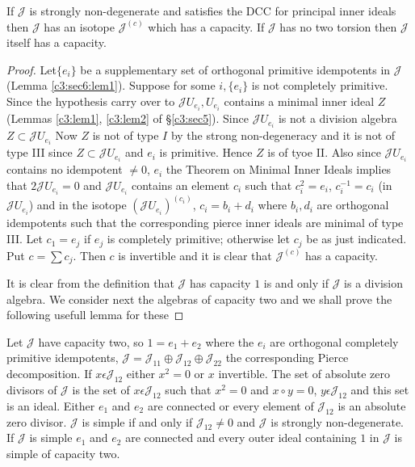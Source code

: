 \begin{thm}\label{c3:thm7}
If $\mathscr{J}$ is strongly non-degenerate and satisfies the DCC for
principal inner ideals then $\mathscr{J}$ has an isotope
$\mathscr{J}^{(c)}$ which has a capacity. If $\mathscr{J}$ has no two
torsion then $\mathscr{J}$ itself has a capacity.
\end{thm}

\begin{proof}
Let\pageoriginale $\{e_i\}$ be a supplementary set of orthogonal
primitive idempotents in $\mathscr{J}$ (Lemma
\ref{c3:sec6:lem1}). Suppose for some 
$i,\{e_i\}$ is not completely primitive. Since the hypothesis carry
over to $\mathscr{J} U_{e_i},U_{e_i}$ contains a minimal inner ideal
$Z$ (Lemmas \ref{c3:lem1}, \ref{c3:lem2} of \S \ref{c3:sec5}). Since
$\mathscr{J}U_{e_i}$ is 
not a division algebra $Z\subset\mathscr{J}U_{e_i}$ Now
$Z$ is not of type $I$ by the strong non-degeneracy and it
is not of type III since $Z\subset \mathscr{J}U_{e_i}$ and
$e_i$ is primitive. Hence $Z$ is of tyoe II. Also since
$\mathscr{J}U_{e_i}$ contains no idempotent $\neq 0$, $e_i$ the
Theorem on Minimal Inner Ideals implies that $2\mathscr{J}U_{e_i}=0$
and $\mathscr{J}U_{e_i}$ contains an element $c_i$ such that
$c^{2}_i=e_i$, $c^{-1}_i=c_i$ (in $\mathscr{J}U_{e_i}$) and in the
isotope $(\mathscr{J}U_{e_{i}})^{(c_i)}$, $c_i=b_i+d_i$ where
$b_i,d_i$ are orthogonal idempotents such that the corresponding
pierce inner ideals are minimal of type III. Let $c_1=e_j$ if $e_j$ is
completely primitive; otherwise let $c_j$ be as just indicated. Put
$c=\sum c_j$. Then $c$ is invertible and it is clear that
$\mathscr{J}^{(c)}$ has a capacity.

It is clear from the definition that $\mathscr{J}$ has capacity $1$ is
and only if $\mathscr{J}$ is a division algebra. We consider next the
algebras of  capacity two and we shall prove the following usefull
lemma for these
\end{proof}

\begin{lemma}\label{c3:sec6:lem2}
Let $\mathscr{J}$ have capacity two, so $1=e_1+e_2$ where the $e_i$
are orthogonal completely primitive idempotents,
$\mathscr{J}=\mathscr{J}_{11}\oplus \mathscr{J}_{12}\oplus
\mathscr{J}_{22}$ the corresponding Pierce decomposition. If $x\epsilon
\mathscr{J}_{12}$ either $x^{2}=0$ or $x$ invertible. The set of
absolute zero divisors of $\mathscr{J}$ is the set of $x\epsilon
\mathscr{J}_{12}$ such that $x^{2}=0$ and $x\circ y=0$, $y\epsilon
\mathscr{J}_{12}$ and this set is an ideal. Either $e_1$ and $e_2$ are
connected or every element of $\mathscr{J}_{12}$ is an\pageoriginale
absolute zero divisor. $\mathscr{J}$ is simple if and only if
$\mathscr{J}_{12}\neq 0$ and $\mathscr{J}$ is strongly
non-degenerate. If $\mathscr{J}$ is simple $e_1$ and $e_2$ are
connected and every outer ideal containing $1$ in $\mathscr{J}$ is
simple of capacity two.
\end{lemma}

